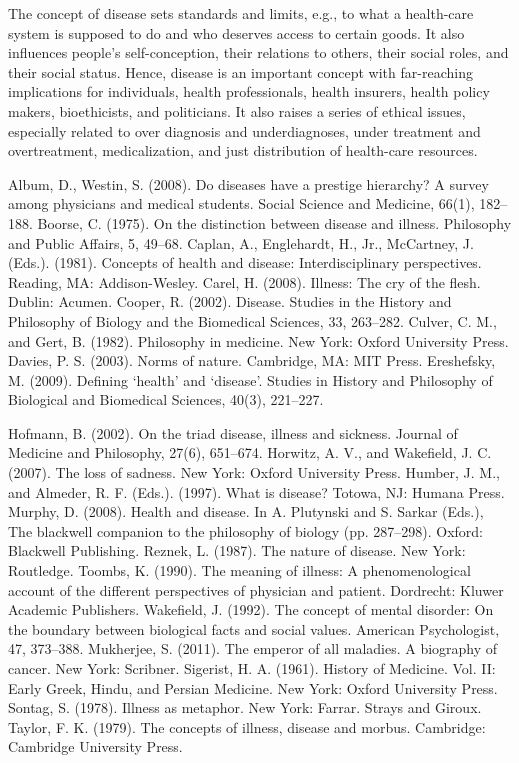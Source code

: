 \documentclass[conference]{IEEEtran}
\begin{document}
The concept of disease sets standards and limits, e.g., to what a health-care system is supposed to do and who deserves access to certain goods. It also inﬂuences people’s self-conception, their relations to others, their social roles, and their social status. Hence, disease is an important concept with far-reaching implications for individuals, health professionals, health insurers, health policy makers,\cite{b12} bioethicists, and politicians. It also raises a series of ethical issues, especially related to over diagnosis and underdiagnoses, under treatment and overtreatment, medicalization, and just distribution of health-care resources.


\begin{thebibliography}{00}
 Album, D.,  Westin, S. (2008). Do diseases have a prestige hierarchy? A survey among physicians and medical students. Social Science and Medicine, 66(1), 182–188.
 Boorse, C. (1975). On the distinction between disease and illness. Philosophy and Public Affairs, 5, 49–68.
 Caplan, A., Englehardt, H., Jr.,  McCartney, J. (Eds.). (1981). Concepts of health and disease: Interdisciplinary perspectives. Reading, MA: Addison-Wesley.
 Carel, H. (2008). Illness: The cry of the ﬂesh. Dublin: Acumen.
 Cooper, R. (2002). Disease. Studies in the History and Philosophy of Biology and the Biomedical Sciences, 33, 263–282.
 Culver, C. M., and Gert, B. (1982). Philosophy in medicine. New York: Oxford University Press.
 Davies, P. S. (2003). Norms of nature. Cambridge, MA: MIT Press.
Ereshefsky, M. (2009). Deﬁning ‘health’ and ‘disease’. Studies in History and Philosophy of Biological and Biomedical Sciences, 40(3), 221–227.

Hofmann, B. (2002). On the triad disease, illness and sickness. Journal of Medicine and Philosophy, 27(6), 651–674.
Horwitz, A. V., and Wakeﬁeld, J. C. (2007). The loss of sadness. New York: Oxford University Press.
Humber, J. M., and Almeder, R. F. (Eds.). (1997). What is disease? Totowa, NJ: Humana Press.
Murphy, D. (2008). Health and disease. In A. Plutynski and S. Sarkar (Eds.), The blackwell companion to the philosophy of biology (pp. 287–298). Oxford: Blackwell Publishing.
Reznek, L. (1987). The nature of disease. New York: Routledge.
Toombs, K. (1990). The meaning of illness: A phenomenological account of the different perspectives of physician and patient. Dordrecht: Kluwer Academic Publishers.
Wakeﬁeld, J. (1992). The concept of mental disorder: On the boundary between biological facts and social values. American Psychologist, 47, 373–388.
Mukherjee, S. (2011). The emperor of all maladies. A biography of cancer. New York: Scribner.
Sigerist, H. A. (1961). History of Medicine. Vol. II: Early Greek, Hindu, and Persian Medicine. New York: Oxford University Press.
Sontag, S. (1978). Illness as metaphor. New York: Farrar. Strays and Giroux.
Taylor, F. K. (1979). The concepts of illness, disease and morbus. Cambridge: Cambridge University Press.
\end{thebibliography}
\end{document}
